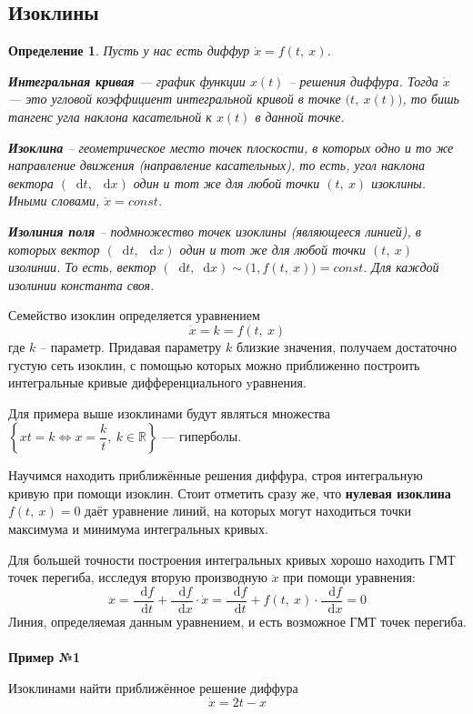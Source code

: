 \documentclass[a4paper,12pt]{article}
\newtheorem{definition}{Определение}
\newcommand{\R}{\mathbb{R}}
\renewcommand*\d{\mathop{}\!\mathrm{d}}
\newcommand{\dx}{\dot{x}}
\newcommand{\ddx}{\ddot{x}}
\begin{document}
\subsection{Изоклины}

\begin{definition}
	Пусть у нас есть диффур $\dx = f(t,\ x)$.
	
	\textbf{Интегральная кривая} --- график функции $x(t)$ -- решения диффура. Тогда $\dx$ --- это угловой коэффициент интегральной кривой в точке $\big(t,\ x(t)\big)$, то бишь тангенс угла наклона касательной к $x(t)$ в данной точке.
	
	\textbf{Изоклина} -- геометрическое место точек плоскости, в которых одно и то же направление движения (направление касательных), то есть, угол наклона вектора $(\d t,\ \d x)$ один и тот же для любой точки $(t,\ x)$ изоклины. Иными словами, $\dx = const$.
	
	\textbf{Изолиния поля} -- подмножество точек изоклины (являющееся линией), в которых вектор $(\d t,\ \d x)$ один и тот же для любой точки  $(t,\ x)$ изолинии. То есть, вектор $(\d t, \d x) \sim \big(1, f(t,\ x)\big) = const$. Для каждой изолинии константа своя.
\end{definition}

Семейство изоклин определяется уравнением
\[\dx = k = f(t,\ x)\] где $k$ -- параметр. Придавая параметру $k$ близкие значения, получаем достаточно густую сеть изоклин, с помощью которых можно приближенно построить интегральные кривые дифференциального yравнения.

Для примера выше изоклинами будут являться множества $\left\{xt = k \iff x = \dfrac{k}{t},\ k \in \R\right\}$ --- гиперболы.

Научимся находить приближённые решения диффура, строя интегральную кривую при помощи изоклин. Стоит отметить сразу же, что \textbf{нулевая изоклина} $f(t,\ x) = 0$ даёт уравнение линий, на которых могут находиться точки максимума и минимума интегральных кривых.

Для большей точности построения интегральных кривых хорошо находить ГМТ точек перегиба, исследуя вторую производную $\ddx$ при помощи уравнения:
\[\ddx = \dfrac{\d f}{\d t} + \dfrac{\d f}{\d x}\cdot \dx = \dfrac{\d f}{\d t} + f(t,\ x) \cdot \dfrac{\d f}{\d x} = 0\]
Линия, определяемая данным уравнением, и есть возможное ГМТ точек перегиба.
\ \\

\textbf{Пример №1}

Изоклинами найти приближённое решение диффура
\[\dx = 2t - x\]
\end{document}
